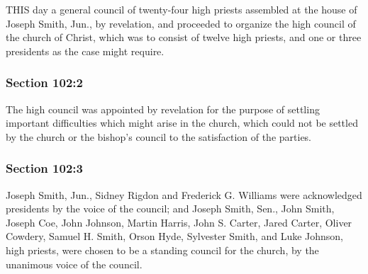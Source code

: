 		THIS day a general council of twenty-four high priests assembled at the house of Joseph Smith, Jun., by revelation, and proceeded to organize the high council of the church of Christ, which was to consist of twelve high priests, and one or three presidents as the case might require.


	\subsubsection{Section 102:2} %
		\label{DC102-2}

		The high council was appointed by revelation for the purpose of settling important difficulties which might arise in the church, which could not be settled by the church or the bishop's council to the satisfaction of the parties.


	\subsubsection{Section 102:3} %
		\label{DC102-3}

		Joseph Smith, Jun., Sidney Rigdon and Frederick G. Williams were acknowledged presidents by the voice of the council; and Joseph Smith, Sen., John Smith, Joseph Coe, John Johnson, Martin Harris, John S. Carter, Jared Carter, Oliver Cowdery, Samuel H. Smith, Orson Hyde, Sylvester Smith, and Luke Johnson, high priests, were chosen to be a standing council for the church, by the unanimous voice of the council.


